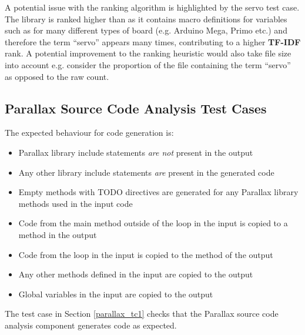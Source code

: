 \documentclass{UoYCSproject}
\begin{document}
A potential issue with the ranking algorithm is highlighted by the servo test case. The  library is ranked higher than  as it contains macro definitions for variables such as  for many different types of board (e.g. Arduino Mega, Primo etc.) and therefore the term ``servo'' appears many times, contributing to a higher \textbf{TF-IDF} rank. A potential improvement to the ranking heuristic would also take file size into account e.g. consider the proportion of the file containing the term ``servo'' as opposed to the raw count.

\subsection{Parallax Source Code Analysis Test Cases} \label{pscatc}
The expected behaviour for code generation is:
\begin{itemize}
\item Parallax library include statements \textit{are not} present in the output
\item Any other library include statements \textit{are} present in the generated code
\item Empty methods with TODO directives are generated for any Parallax library methods used in the input code
\item Code from the main method outside of the  loop in the input is copied to a  method in the output
\item Code from the  loop in the input is copied to the  method of the output
\item Any other methods defined in the input are copied to the output
\item Global variables in the input are copied to the output
\end{itemize}
The test case in Section \ref{parallax_tc1} checks that the Parallax source code analysis component generates code as expected.
\end{document}

